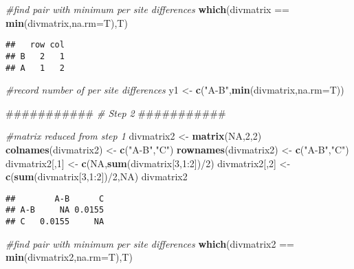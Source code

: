 \documentclass[]{article}
\newenvironment{Shaded}{\begin{snugshade}}{\end{snugshade}}
\newcommand{\KeywordTok}[1]{\textcolor[rgb]{0.13,0.29,0.53}{\textbf{{#1}}}}
\newcommand{\DataTypeTok}[1]{\textcolor[rgb]{0.13,0.29,0.53}{{#1}}}
\newcommand{\DecValTok}[1]{\textcolor[rgb]{0.00,0.00,0.81}{{#1}}}
\newcommand{\StringTok}[1]{\textcolor[rgb]{0.31,0.60,0.02}{{#1}}}
\newcommand{\CommentTok}[1]{\textcolor[rgb]{0.56,0.35,0.01}{\textit{{#1}}}}
\newcommand{\OtherTok}[1]{\textcolor[rgb]{0.56,0.35,0.01}{{#1}}}
\newcommand{\NormalTok}[1]{{#1}}
\begin{document}
\begin{Shaded}
\begin{Highlighting}[]
\CommentTok{#find pair with minimum per site differences}
\KeywordTok{which}\NormalTok{(divmatrix ==}\StringTok{ }\KeywordTok{min}\NormalTok{(divmatrix,}\DataTypeTok{na.rm=}\NormalTok{T),T)}
\end{Highlighting}
\end{Shaded}

\begin{verbatim}
##   row col
## B   2   1
## A   1   2
\end{verbatim}

\begin{Shaded}
\begin{Highlighting}[]
\CommentTok{#record number of per site differences}
\NormalTok{y1 <-}\StringTok{ }\KeywordTok{c}\NormalTok{(}\StringTok{"A-B"}\NormalTok{,}\KeywordTok{min}\NormalTok{(divmatrix,}\DataTypeTok{na.rm=}\NormalTok{T))}

\NormalTok{###########}
\CommentTok{# Step 2}
\NormalTok{###########}

\CommentTok{#matrix reduced from step 1}
\NormalTok{divmatrix2 <-}\StringTok{ }\KeywordTok{matrix}\NormalTok{(}\OtherTok{NA}\NormalTok{,}\DecValTok{2}\NormalTok{,}\DecValTok{2}\NormalTok{)}
\KeywordTok{colnames}\NormalTok{(divmatrix2) <-}\StringTok{ }\KeywordTok{c}\NormalTok{(}\StringTok{"A-B"}\NormalTok{,}\StringTok{"C"}\NormalTok{)}
\KeywordTok{rownames}\NormalTok{(divmatrix2) <-}\StringTok{ }\KeywordTok{c}\NormalTok{(}\StringTok{"A-B"}\NormalTok{,}\StringTok{"C"}\NormalTok{)}
\NormalTok{divmatrix2[,}\DecValTok{1}\NormalTok{] <-}\StringTok{ }\KeywordTok{c}\NormalTok{(}\OtherTok{NA}\NormalTok{,}\KeywordTok{sum}\NormalTok{(divmatrix[}\DecValTok{3}\NormalTok{,}\DecValTok{1}\NormalTok{:}\DecValTok{2}\NormalTok{])/}\DecValTok{2}\NormalTok{)}
\NormalTok{divmatrix2[,}\DecValTok{2}\NormalTok{] <-}\StringTok{ }\KeywordTok{c}\NormalTok{(}\KeywordTok{sum}\NormalTok{(divmatrix[}\DecValTok{3}\NormalTok{,}\DecValTok{1}\NormalTok{:}\DecValTok{2}\NormalTok{])/}\DecValTok{2}\NormalTok{,}\OtherTok{NA}\NormalTok{)}
\NormalTok{divmatrix2}
\end{Highlighting}
\end{Shaded}

\begin{verbatim}
##        A-B      C
## A-B     NA 0.0155
## C   0.0155     NA
\end{verbatim}

\begin{Shaded}
\begin{Highlighting}[]
\CommentTok{#find pair with minimum per site differences}
\KeywordTok{which}\NormalTok{(divmatrix2 ==}\StringTok{ }\KeywordTok{min}\NormalTok{(divmatrix2,}\DataTypeTok{na.rm=}\NormalTok{T),T)}
\end{Highlighting}
\end{Shaded}
\end{document}
